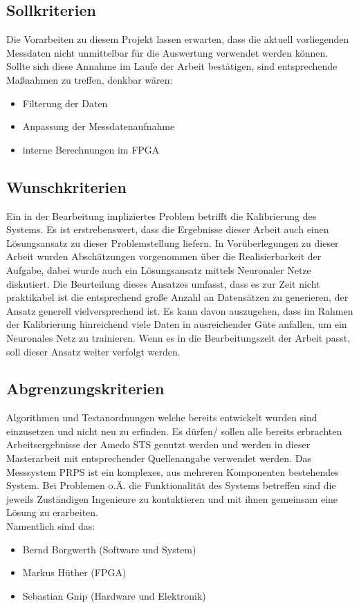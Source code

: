 \documentclass[a4paper,12pt,fleqn]{article}
\begin{document}
\subsection{Sollkriterien}
Die Vorarbeiten zu diesem Projekt lassen erwarten, dass die aktuell vorliegenden Messdaten nicht unmittelbar für die Auswertung verwendet werden können. Sollte sich diese Annahme im Laufe der Arbeit bestätigen, sind entsprechende Maßnahmen zu treffen, denkbar wären:
%
\begin{itemize}
\item Filterung der Daten
\item Anpassung der Messdatenaufnahme
\item interne Berechnungen im FPGA
\end{itemize}
%
\subsection{Wunschkriterien}
Ein in der Bearbeitung impliziertes Problem betrifft die Kalibrierung des Systems. Es ist erstrebenswert, dass die Ergebnisse dieser Arbeit auch einen Lösungsansatz zu dieser Problemstellung liefern. In Vorüberlegungen zu dieser Arbeit wurden Abschätzungen vorgenommen über die Realisierbarkeit der Aufgabe, dabei wurde auch ein Lösungsansatz mittels Neuronaler Netze diskutiert. Die Beurteilung dieses Ansatzes umfasst, dass es zur Zeit nicht praktikabel ist die entsprechend große Anzahl an Datensätzen zu generieren, der Ansatz generell vielversprechend ist. Es kann davon auszugehen, dass im Rahmen der Kalibrierung hinreichend viele Daten in ausreichender Güte anfallen, um ein Neuronales Netz zu trainieren. Wenn es in die Bearbeitungszeit der Arbeit passt, soll dieser Ansatz weiter verfolgt werden.
%
\subsection{Abgrenzungskriterien}
Algorithmen und Testanordnungen welche bereits entwickelt wurden sind einzusetzen und nicht neu zu erfinden. Es dürfen/ sollen alle bereits erbrachten Arbeitsergebnisse der Amedo STS genutzt werden und werden in dieser Masterarbeit mit entsprechender Quellenangabe verwendet werden. Das Messsystem PRPS ist ein komplexes, aus mehreren Komponenten bestehendes System. Bei Problemen o.Ä. die Funktionalität des Systems betreffen sind die jeweils Zuständigen Ingenieure zu kontaktieren und mit ihnen gemeinsam eine Lösung zu erarbeiten. \\
Namentlich sind das:
\begin{itemize}
\item Bernd Borgwerth (Software und System)
\item Markus Hüther (FPGA)
\item Sebastian Gnip (Hardware und Elektronik)
\end{itemize}
%
\end{document}
